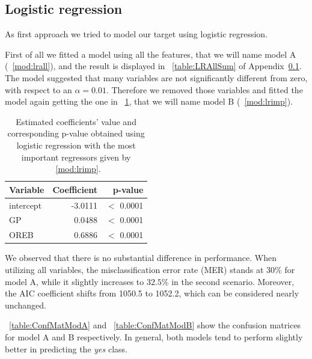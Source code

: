 \subsection{Logistic regression}\label{appendix:lr}

As first approach we tried to model our target using logistic regression.

First of all we fitted a model using all the features, that we will name model A (\Mod~\ref{mod:lrall}), and the result is displayed in \Tab~\ref{table:LRAllSum} of Appendix~\ref{appendix:lr}. The model suggested that many variables are not significantly different from zero, with respect to an $\alpha = 0.01$. Therefore we removed those variables and fitted the model again getting the one in \Tab~\ref{table:LRImpSum}, that we will name model B (\Mod~\ref{mod:lrimp}).

\begin{center}
\end{center}

\begin{table}[h]
	\centering
	\begin{tabular}{|| l | r | r ||} 
		\hline
		Variable & Coefficient & p-value \\
		\hline
		\hline
		intercept & -3.0111 & $<$ 0.0001 \\
		GP & 0.0488 & $<$ 0.0001 \\
		OREB & 0.6886 & $<$ 0.0001 \\	
		\hline
	\end{tabular}
	\caption{Estimated coefficients' value and corresponding p-value obtained using logistic regression with the most important regressors given by \Mod~\ref{mod:lrimp}.}
	\label{table:LRImpSum}
\end{table}

We observed that there is no substantial difference in performance. When utilizing all variables, the misclassification error rate (MER) stands at $30\%$ for model A, while it slightly increases to $32.5\%$ in the second scenario. Moreover, the AIC coefficient shifts from 1050.5 to 1052.2, which can be considered nearly unchanged.

\Tab~\ref{table:ConfMatModA} and \Tab~\ref{table:ConfMatModB} show the confusion matrices for model A and B respectively. In general, both models tend to perform slightly better in predicting the \textit{yes} class.

